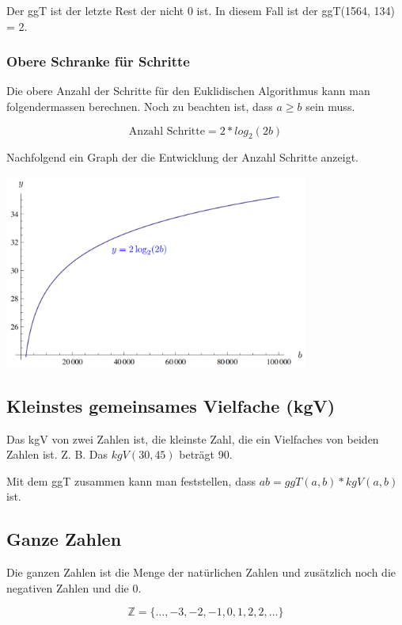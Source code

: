 \documentclass[12pt, a4paper, oneside]{article}
\begin{document}
Der ggT ist der letzte Rest der nicht $0$ ist. In diesem Fall ist der ggT(1564, 134) = 2.

\subsubsection{Obere Schranke für Schritte}
Die obere Anzahl der Schritte für den Euklidischen Algorithmus kann man folgendermassen berechnen. Noch zu beachten ist, dass $a \ge b$ sein muss.

\begin{equation*}
  \text{Anzahl Schritte} = 2 * log_{2} (2b)
\end{equation*}

Nachfolgend ein Graph der die Entwicklung der Anzahl Schritte anzeigt.
\begin{center}
  \includegraphics[width=0.75\textwidth]{euklid.png}
\end{center} 

\subsection{Kleinstes gemeinsames Vielfache (kgV)}
Das kgV von zwei Zahlen ist, die kleinste Zahl, die ein Vielfaches von beiden Zahlen ist. Z. B. Das $kgV(30, 45)$ beträgt 90.

Mit dem ggT zusammen kann man feststellen, dass $ab = ggT(a, b) * kgV(a, b)$ ist.

\subsection{Ganze Zahlen}
Die ganzen Zahlen ist die Menge der natürlichen Zahlen und zusätzlich noch die negativen Zahlen und die 0.

\begin{equation*}
  \mathbb{Z} = \{..., -3, -2, -1, 0, 1, 2, 2, ...\}
\end{equation*}
\end{document}
